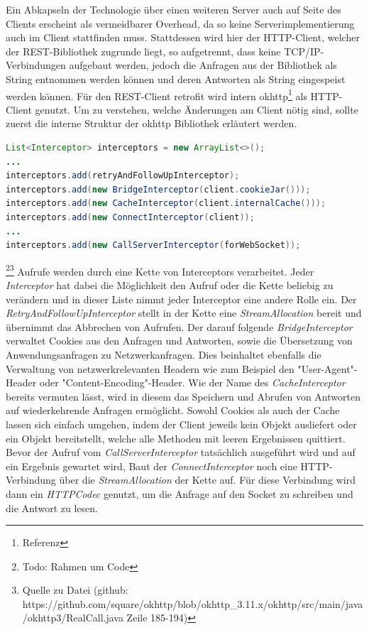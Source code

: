 \documentclass[12pt,a4paper]{article}
\begin{document}
        
        Ein Abkapseln der Technologie über einen weiteren Server auch auf Seite des Clients erscheint als vermeidbarer Overhead, da so keine Serverimplementierung auch im Client stattfinden muss. Stattdessen wird hier der HTTP-Client, welcher der REST-Bibliothek zugrunde liegt, so aufgetrennt, dass keine TCP/IP-Verbindungen aufgebaut werden, jedoch die Anfragen aus der Bibliothek als String entnommen werden können und  deren Antworten als String eingespeist werden können. Für den REST-Client retrofit wird intern okhttp\footnote{Referenz} als HTTP-Client genutzt. Um zu verstehen, welche Änderungen am Client nötig sind, sollte zuerst die interne Struktur der okhttp Bibliothek erläutert werden.
        \begin{lstlisting}[language=Java, caption=Interner Aufbau von okhttp (Client: Java)]
List<Interceptor> interceptors = new ArrayList<>();
...
interceptors.add(retryAndFollowUpInterceptor);
interceptors.add(new BridgeInterceptor(client.cookieJar()));
interceptors.add(new CacheInterceptor(client.internalCache()));
interceptors.add(new ConnectInterceptor(client));
...
interceptors.add(new CallServerInterceptor(forWebSocket));
        \end{lstlisting}
        \footnote{Todo: Rahmen um Code}\footnote{Quelle zu Datei (github: https://github.com/square/okhttp/blob/okhttp\_3.11.x/okhttp/src/main/java/okhttp3/RealCall.java Zeile 185-194)} Aufrufe werden durch eine Kette von Interceptors verarbeitet. Jeder {\it Interceptor} hat dabei die Möglichkeit den Aufruf oder die Kette beliebig zu verändern und in dieser Liste nimmt jeder Interceptor eine andere Rolle ein. Der {\it RetryAndFollowUpInterceptor} stellt in der Kette eine {\it StreamAllocation} bereit und übernimmt das Abbrechen von Aufrufen. Der darauf folgende {\it BridgeInterceptor} verwaltet Cookies aus den Anfragen und Antworten, sowie die Übersetzung von Anwendungsanfragen zu Netzwerkanfragen. Dies beinhaltet ebenfalls die Verwaltung von netzwerkrelevanten Headern wie zum Beispiel den "User-Agent"-Header oder "Content-Encoding"-Header. Wie der Name des {\it CacheInterceptor} bereits vermuten lässt, wird in diesem das Speichern und Abrufen von Antworten auf wiederkehrende Anfragen ermöglicht. Sowohl Cookies als auch der Cache lassen sich einfach umgehen, indem der Client jeweils kein Objekt ausliefert oder ein Objekt bereitstellt, welche alle Methoden mit leeren Ergebnissen quittiert. Bevor der Aufruf vom {\it CallServerInterceptor} tatsächlich ausgeführt wird und auf ein Ergebnis gewartet wird, Baut der {\it ConnectInterceptor} noch eine HTTP-Verbindung über die {\it StreamAllocation} der Kette auf. Für diese Verbindung wird dann ein {\it HTTPCodec} genutzt, um die Anfrage auf den Socket zu schreiben und die Antwort zu lesen.
        
\end{document}
